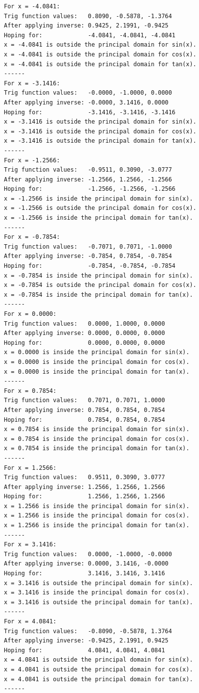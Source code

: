 \begin{verbatim}
For x = -4.0841:
Trig function values:   0.8090, -0.5878, -1.3764
After applying inverse: 0.9425, 2.1991, -0.9425
Hoping for:             -4.0841, -4.0841, -4.0841
x = -4.0841 is outside the principal domain for sin(x).
x = -4.0841 is outside the principal domain for cos(x).
x = -4.0841 is outside the principal domain for tan(x).
------
For x = -3.1416:
Trig function values:   -0.0000, -1.0000, 0.0000
After applying inverse: -0.0000, 3.1416, 0.0000
Hoping for:             -3.1416, -3.1416, -3.1416
x = -3.1416 is outside the principal domain for sin(x).
x = -3.1416 is outside the principal domain for cos(x).
x = -3.1416 is outside the principal domain for tan(x).
------
For x = -1.2566:
Trig function values:   -0.9511, 0.3090, -3.0777
After applying inverse: -1.2566, 1.2566, -1.2566
Hoping for:             -1.2566, -1.2566, -1.2566
x = -1.2566 is inside the principal domain for sin(x).
x = -1.2566 is outside the principal domain for cos(x).
x = -1.2566 is inside the principal domain for tan(x).
------
For x = -0.7854:
Trig function values:   -0.7071, 0.7071, -1.0000
After applying inverse: -0.7854, 0.7854, -0.7854
Hoping for:             -0.7854, -0.7854, -0.7854
x = -0.7854 is inside the principal domain for sin(x).
x = -0.7854 is outside the principal domain for cos(x).
x = -0.7854 is inside the principal domain for tan(x).
------
For x = 0.0000:
Trig function values:   0.0000, 1.0000, 0.0000
After applying inverse: 0.0000, 0.0000, 0.0000
Hoping for:             0.0000, 0.0000, 0.0000
x = 0.0000 is inside the principal domain for sin(x).
x = 0.0000 is inside the principal domain for cos(x).
x = 0.0000 is inside the principal domain for tan(x).
------
For x = 0.7854:
Trig function values:   0.7071, 0.7071, 1.0000
After applying inverse: 0.7854, 0.7854, 0.7854
Hoping for:             0.7854, 0.7854, 0.7854
x = 0.7854 is inside the principal domain for sin(x).
x = 0.7854 is inside the principal domain for cos(x).
x = 0.7854 is inside the principal domain for tan(x).
------
For x = 1.2566:
Trig function values:   0.9511, 0.3090, 3.0777
After applying inverse: 1.2566, 1.2566, 1.2566
Hoping for:             1.2566, 1.2566, 1.2566
x = 1.2566 is inside the principal domain for sin(x).
x = 1.2566 is inside the principal domain for cos(x).
x = 1.2566 is inside the principal domain for tan(x).
------
For x = 3.1416:
Trig function values:   0.0000, -1.0000, -0.0000
After applying inverse: 0.0000, 3.1416, -0.0000
Hoping for:             3.1416, 3.1416, 3.1416
x = 3.1416 is outside the principal domain for sin(x).
x = 3.1416 is inside the principal domain for cos(x).
x = 3.1416 is outside the principal domain for tan(x).
------
For x = 4.0841:
Trig function values:   -0.8090, -0.5878, 1.3764
After applying inverse: -0.9425, 2.1991, 0.9425
Hoping for:             4.0841, 4.0841, 4.0841
x = 4.0841 is outside the principal domain for sin(x).
x = 4.0841 is outside the principal domain for cos(x).
x = 4.0841 is outside the principal domain for tan(x).
------
\end{verbatim}



